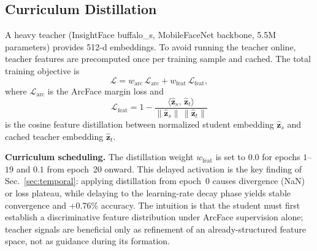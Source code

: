 \subsection{Curriculum Distillation}
\label{sec:distill}

A heavy teacher (InsightFace buffalo\_s, MobileFaceNet backbone, 5.5M parameters) provides 512-d embeddings. To avoid running the teacher online, teacher features are precomputed once per training sample and cached. The total training objective is
\begin{equation}
    \mathcal{L} = w_{\mathrm{arc}}\,\mathcal{L}_{\mathrm{arc}} + w_{\mathrm{feat}}\,\mathcal{L}_{\mathrm{feat}},
    \label{eq:total}
\end{equation}
where $\mathcal{L}_{\mathrm{arc}}$ is the ArcFace margin loss and
\begin{equation}
    \mathcal{L}_{\mathrm{feat}} = 1 - \frac{\langle \hat{\mathbf{z}}_s,\, \hat{\mathbf{z}}_t\rangle}{\|\hat{\mathbf{z}}_s\|\,\|\hat{\mathbf{z}}_t\|}
    \label{eq:feat}
\end{equation}
is the cosine feature distillation between normalized student embedding $\hat{\mathbf{z}}_s$ and cached teacher embedding $\hat{\mathbf{z}}_t$.

\textbf{Curriculum scheduling.} The distillation weight $w_{\mathrm{feat}}$ is set to $0.0$ for epochs $1$--$19$ and $0.1$ from epoch~20 onward. This delayed activation is the key finding of Sec.~\ref{sec:temporal}: applying distillation from epoch~0 causes divergence (NaN) or loss plateau, while delaying to the learning-rate decay phase yields stable convergence and $+0.76\%$ accuracy. The intuition is that the student must first establish a discriminative feature distribution under ArcFace supervision alone; teacher signals are beneficial only as refinement of an already-structured feature space, not as guidance during its formation.
